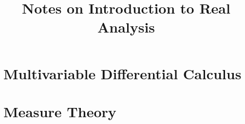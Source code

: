 \documentclass[12pt]{article}
\begin{document}
\title{Notes on Introduction to Real Analysis}
\author{}
\date{}
\maketitle

\tableofcontents
\section{Multivariable Differential Calculus}

\newpage
\section{Measure Theory}

\end{document}
